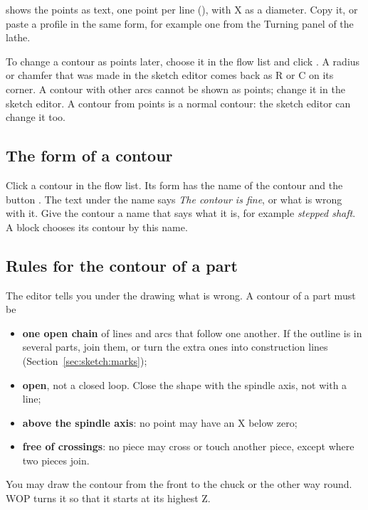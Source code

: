  shows the points as text, one point per line (), with X as a diameter. Copy it, or paste a profile in the same form, for example one from the Turning panel of the lathe.

To change a contour as points later, choose it in the flow list and click . A radius or chamfer that was made in the sketch editor comes back as R or C on its corner. A contour with other arcs cannot be shown as points; change it in the sketch editor. A contour from points is a normal contour: the sketch editor can change it too.

\subsection{The form of a contour}
Click a contour in the flow list. Its form has the name of the contour and the button . The text under the name says \emph{The contour is fine}, or what is wrong with it. Give the contour a name that says what it is, for example \emph{stepped shaft}. A block chooses its contour by this name.


\subsection{Rules for the contour of a part}
The editor tells you under the drawing what is wrong. A contour of a part must be

\begin{itemize}
\item \textbf{one open chain} of lines and arcs that follow one another. If the outline is in several parts, join them, or turn the extra ones into construction lines (Section~\ref{sec:sketch:marks});
\item \textbf{open}, not a closed loop. Close the shape with the spindle axis, not with a line;
\item \textbf{above the spindle axis}: no point may have an X below zero;
\item \textbf{free of crossings}: no piece may cross or touch another piece, except where two pieces join.
\end{itemize}

You may draw the contour from the front to the chuck or the other way round. WOP turns it so that it starts at its highest Z.

